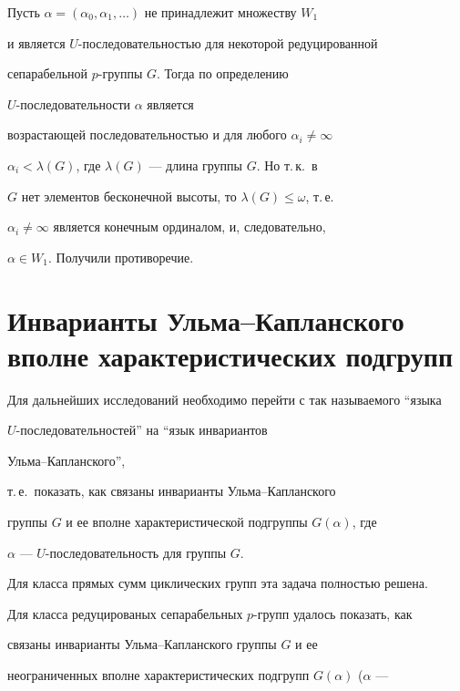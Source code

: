 \begin{pf}


Пусть $\alpha=(\alpha_0, \alpha_1, \dotsc)$ не принадлежит множеству $W_1$


и является $U$-последовательностью для некоторой редуцированной


сепарабельной $p$-группы $G$. Тогда по определению


$U$-последовательности $\alpha$ является


возрастающей последовательностью и для любого $\alpha_i \neq \infty$\;


$\alpha_i<\lambda(G)$, где $\lambda(G)$ --- длина группы $G$. Но т.\,к.\ в


$G$ нет элементов бесконечной высоты, то $\lambda(G)\leq\omega$, т.\,е.\


$\alpha_i\neq \infty$ является конечным ординалом, и, следовательно,


$\alpha\in W_1$. Получили противоречие.


\end{pf}





\section{Инварианты Ульма--Капланского вполне характеристических подгрупп}





Для дальнейших исследований необходимо перейти с так называемого ``языка


$U$-после\-до\-ва\-тель\-нос\-тей'' на ``язык инвариантов


Ульма--Капланского'',


т.\,е.\ показать, как связаны инварианты Ульма--Капланского


группы $G$ и ее вполне характеристической подгруппы $G(\alpha)$, где


$\alpha$ --- $U$-после\-до\-ва\-тель\-ность для группы $G$.





Для класса прямых сумм циклических групп эта задача полностью решена.


Для класса редуцированых сепарабельных $p$-групп удалось показать, как


связаны инварианты Ульма--Капланского группы $G$ и ее


неограниченных вполне характеристических подгрупп $G(\alpha)$ ($\alpha$ ---


